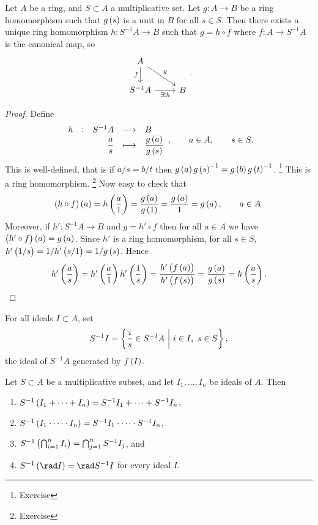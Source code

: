 
\begin{lemma}
Let $ A $ be a ring, and $ S \subset A $ a multiplicative set. Let $ g : A \to B $ be a ring homomorphism such that $ g\br{s} $ is a unit in $ B $ for all $ s \in S $. Then there exists a unique ring homomorphism $ h : S^{-1}A \to B $ such that $ g = h \circ f $ where $ f : A \to S^{-1}A $ is the canonical map, so
$$
\begin{tikzcd}
A \arrow[swap]{d}{f} \arrow{dr}{g} & \\
S^{-1}A \arrow[swap]{r}{\exists !h} & B
\end{tikzcd}.
$$
\end{lemma}

\pagebreak

\begin{proof}
Define
$$ \function[h]{S^{-1}A}{B}{\dfrac{a}{s}}{\dfrac{g\br{a}}{g\br{s}}}, \qquad a \in A, \qquad s \in S. $$
This is well-defined, that is if $ a / s = b / t $ then $ g\br{a}g\br{s}^{-1} = g\br{b}g\br{t}^{-1} $. \footnote{Exercise} This is a ring homomorphism. \footnote{Exercise} Now easy to check that
$$ \br{h \circ f}\br{a} = h\br{\dfrac{a}{1}} = \dfrac{g\br{a}}{g\br{1}} = \dfrac{g\br{a}}{1} = g\br{a}, \qquad a \in A. $$
Moreover, if $ h' : S^{-1}A \to B $ and $ g = h' \circ f $ then for all $ a \in A $ we have $ \br{h' \circ f}\br{a} = g\br{a} $. Since $ h' $ is a ring homomorphism, for all $ s \in S $, $ h'\br{1 / s} = 1 / h'\br{s / 1} = 1 / g\br{s} $. Hence
$$ h'\br{\dfrac{a}{s}} = h'\br{\dfrac{a}{1}}h'\br{\dfrac{1}{s}} = \dfrac{h'\br{f\br{a}}}{h'\br{f\br{s}}} = \dfrac{g\br{a}}{g\br{s}} = h\br{\dfrac{a}{s}}. $$
\end{proof}

For all ideals $ I \subset A $, set
$$ S^{-1}I = \cbr{\dfrac{i}{s} \in S^{-1}A \st i \in I, \ s \in S}, $$
the ideal of $ S^{-1}A $ generated by $ f\br{I} $.

\begin{proposition}
Let $ S \subset A $ be a multiplicative subset, and let $ I_1, \dots, I_n $ be ideals of $ A $. Then
\begin{enumerate}
\item $ S^{-1}\br{I_1 + \dots + I_n} = S^{-1}I_1 + \dots + S^{-1}I_n $,
\item $ S^{-1}\br{I_1 \cdot \dots \cdot I_n} = S^{-1}I_1 \cdot \dots \cdot S^{-1}I_n $,
\item $ S^{-1}\br{\bigcap_{i = 1}^n I_i} = \bigcap_{j = 1}^n S^{-1}I_j $, and
\item $ S^{-1}\br{\rad I} = \rad S^{-1}I $ for every ideal $ I $.
\end{enumerate}
\end{proposition}

